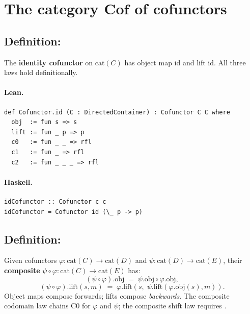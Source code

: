 \documentclass[11pt,a4paper]{article}
\begin{document}
\section{The category $\mathbf{Cof}$ of cofunctors}

\subsection{Definition: }

\begin{defn}
The \textbf{identity cofunctor} on $\mathrm{cat}(C)$ has object map
$\mathrm{id}$ and lift $\mathrm{id}$.  All three laws hold definitionally.
\end{defn}

\paragraph{Lean.}
\begin{lstlisting}[style=lean]
def Cofunctor.id (C : DirectedContainer) : Cofunctor C C where
  obj  := fun s => s
  lift := fun _ p => p
  c0   := fun _ _ => rfl
  c1   := fun _ => rfl
  c2   := fun _ _ _ => rfl
\end{lstlisting}

\paragraph{Haskell.}
\begin{lstlisting}[style=haskell]
idCofunctor :: Cofunctor c c
idCofunctor = Cofunctor id (\_ p -> p)
\end{lstlisting}


\subsection{Definition: }

\begin{defn}
Given cofunctors $\varphi : \mathrm{cat}(C) \to \mathrm{cat}(D)$ and
$\psi : \mathrm{cat}(D) \to \mathrm{cat}(E)$, their \textbf{composite}
$\psi \circ \varphi : \mathrm{cat}(C) \to \mathrm{cat}(E)$ has:
\[
  (\psi \circ \varphi).\mathrm{obj} \;=\; \psi.\mathrm{obj} \circ \varphi.\mathrm{obj},
\]
\[
  (\psi \circ \varphi).\mathrm{lift}(s, m)
  \;=\; \varphi.\mathrm{lift}(s,\; \psi.\mathrm{lift}(\varphi.\mathrm{obj}(s), m)).
\]
Object maps compose forwards; lifts compose \emph{backwards}.  The composite
codomain law chains C0 for $\varphi$ and $\psi$; the composite shift law
requires .
\end{defn}
\end{document}
